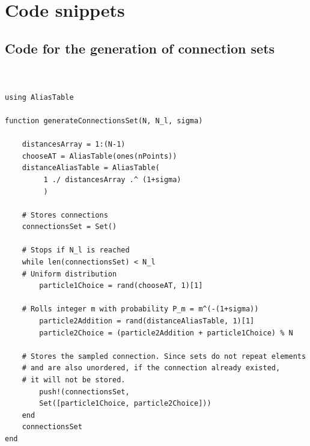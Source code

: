 \documentclass[a4paper]{article}
\providecommand{\DIFaddbegin}{} %
\providecommand{\DIFaddend}{} %
\newcommand{\DIFaddincludegraphics}[2][]{{\color{blue}\fbox{\DIFOincludegraphics[#1]{#2}}}} %
\DeclareRobustCommand{\DIFaddbegin}{\DIFOaddbegin \let\includegraphics\DIFaddincludegraphics} %
\DeclareRobustCommand{\DIFaddend}{\DIFOaddend \let\includegraphics\DIFOincludegraphics} %
\begin{document}
\DIFaddbegin \newpage
\DIFaddend %

\newpage
\appendix
\section{Code snippets}%
\label{sec:Code for the connection set method}

\subsection{Code for the generation of connection sets}%
\label{sub:Code for the generation of connection sets}

\begin{lstlisting}


using AliasTable

function generateConnectionsSet(N, N_l, sigma)

    distancesArray = 1:(N-1)
    chooseAT = AliasTable(ones(nPoints))
    distanceAliasTable = AliasTable(
   		 1 ./ distancesArray .^ (1+sigma)
		 )

    # Stores connections
    connectionsSet = Set() 

    # Stops if N_l is reached
    while len(connectionsSet) < N_l
	# Uniform distribution
        particle1Choice = rand(chooseAT, 1)[1]

	# Rolls integer m with probability P_m = m^(-(1+sigma))
        particle2Addition = rand(distanceAliasTable, 1)[1]
        particle2Choice = (particle2Addition + particle1Choice) % N

	# Stores the sampled connection. Since sets do not repeat elements 
	# and are also unordered, if the connection already existed,
	# it will not be stored.
        push!(connectionsSet, 
		Set([particle1Choice, particle2Choice]))
    end
    connectionsSet
end
\end{lstlisting}
\end{document}
